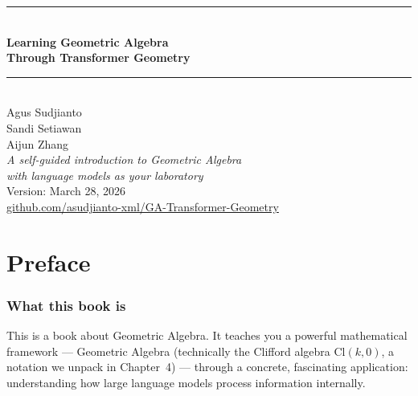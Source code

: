 \documentclass[11pt, twoside, openright]{memoir}
\numberwithin{equation}{chapter}
\begin{document}

\frontmatter
\pagestyle{empty}


\begin{titlingpage}
\vspace*{1.5cm}
\begin{center}
  {\color{Navy}\rule{\linewidth}{2pt}}\\[12pt]
  {\Huge\bfseries\sffamily\color{Navy} Learning Geometric Algebra}\\[10pt]
  {\LARGE\bfseries\sffamily\color{Navy} Through Transformer Geometry}\\[10pt]
  {\color{Navy}\rule{\linewidth}{1.5pt}}\\[20pt]
  {\large\sffamily\color{DGray} Agus Sudjianto}\\[16pt]
  {\large\sffamily\color{DGray} Sandi Setiawan}\\[16pt]
  {\large\sffamily\color{DGray} Aijun Zhang}\\[40pt]
  {\normalsize\itshape\color{DGray}
   A self-guided introduction to Geometric Algebra\\
   with language models as your laboratory}\\[30pt]
  {\small\sffamily\color{DGray} Version: March 28, 2026}\\[20pt]
  {\small\sffamily\color{Blue}
   \href{https://github.com/asudjianto-xml/GA-Transformer-Geometry}%
   {github.com/asudjianto-xml/GA-Transformer-Geometry}}
\end{center}
\end{titlingpage}
\clearpage

\chapter*{Preface}

\subsection*{What this book is}

This is a book about Geometric Algebra.  It teaches you a powerful
mathematical framework --- Geometric Algebra (technically the Clifford
algebra $\mathrm{Cl}(k,0)$, a notation we unpack in Chapter~4) ---
through a concrete, fascinating application: understanding how large
language models process information internally.
\end{document}
